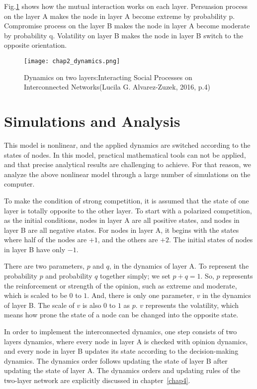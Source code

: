 Fig.\ref{chap2_dynamics} shows how the mutual interaction works on each layer. Persuasion process on the layer A makes the node in layer A become extreme by probability p. Compromise process on the layer B makes the node in layer A become moderate by probability q. Volatility on layer B makes the node in layer B switch to the opposite orientation.   

\begin{figure}[!htb]
	\centering
	\texttt{[image: chap2\_dynamics.png]}
	\caption{Dynamics on two layers:Interacting Social Processes on Interconnected Networks(Lucila G. Alvarez-Zuzek, 2016, p.4)}
	\label{chap2_dynamics}
\end{figure}

\section{Simulations and Analysis}
This model is nonlinear, and the applied dynamics are switched according to the states of nodes. In this model, practical mathematical tools can not be applied, and that precise analytical results are challenging to achieve\parencite{nicolas2017, rainer2002}. For that reason, we analyze the above nonlinear model through a large number of simulations on the computer.

To make the condition of strong competition, it is assumed that the state of one layer is totally opposite to the other layer. To start with a polarized competition, as the initial conditions,  nodes in layer A are all positive states, and nodes in layer B are all negative states. For nodes in layer A, it begins with the states where half of the nodes are $+1$, and the others are $+2$. The initial states of nodes in layer B have only $-1$.

There are two parameters, $p$ and $q$, in the dynamics of layer A. To represent the probability $p$ and probability $q$ together simply; we set $p+q=1$. So, $p$ represents the reinforcement or strength of the opinion, such as extreme and moderate, which is scaled to be $0$ to $1$. And, there is only one parameter, $v$ in the dynamics of layer B. The scale of $v$ is also $0$ to $1$ as $p$. $v$ represents the volatility, which means how prone the state of a node can be changed into the opposite state.

In order to implement the interconnected dynamics, one step consists of two layers dynamics, where every node in layer A is checked with opinion dynamics, and every node in layer B updates its state according to the decision-making dynamics. The dynamics order follows updating the state of layer B after updating the state of layer A. The dynamics orders and updating rules of the two-layer network are explicitly discussed in chapter~\ref{chap4}.     

